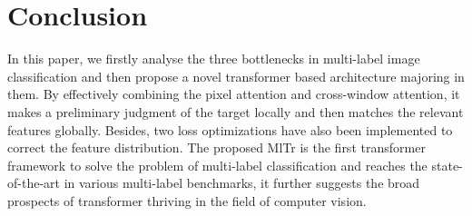 \documentclass{article} \usepackage[numbers,sort&compress]{natbib}
\begin{document}
\section{Conclusion}
In this paper, we firstly analyse the three bottlenecks in multi-label image classification and then propose a novel transformer based architecture majoring in them. By effectively combining the pixel attention and cross-window attention, it makes a preliminary judgment of the target locally and then matches the relevant features globally. Besides, two loss optimizations have also been implemented to correct the feature distribution. The proposed MlTr is the first transformer framework to solve the problem of multi-label classification and reaches the state-of-the-art in various multi-label benchmarks, it further suggests the broad prospects of transformer thriving in the field of computer vision.
























\appendix
\end{document}
